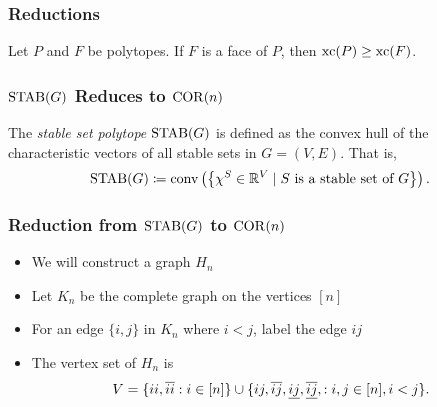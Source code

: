 \begin{frame}
\frametitle{Reductions}
\begin{lemma}
Let $P$ and $F$ be polytopes. If $F$ is a face of $P$, then $\operatorname{xc}(P) \ge \operatorname{xc}(F)$.
\end{lemma}
\end{frame}

\begin{frame}
\frametitle{$\operatorname{STAB}(G)$ Reduces to $\operatorname{COR}(n)$}
\begin{definition}
The \emph{stable set polytope} $\operatorname{STAB}(G)$ is defined as the convex hull of the characteristic vectors of all stable sets in $G = (V, E)$. That is,
\[
\operatorname{STAB}(G) \coloneqq \operatorname{conv}\left(\left\{\chi^S \in \mathbb{R}^V \mid S \text{ is a stable set of $G$}\right\}\right).
\]
\end{definition}
\end{frame}

\begin{frame}
\frametitle{Reduction from $\operatorname{STAB}(G)$ to $\operatorname{COR}(n)$}
\begin{itemize}
\item<1-> We will construct a graph $H_n$
\item<2-> Let $K_n$ be the complete graph on the vertices $[n]$
\item<3-> For an edge $\{i,j\}$ in $K_n$ where $i < j$, label the edge $ij$
\item<4-> The vertex set of $H_n$ is
\[
V = \{ii, \overline{ii} : i \in [n]\} \cup \{ij, \overline{ij}, \underline{ij}, \overline{\underline{ij}}, : i,j \in [n], i < j\}.
\]
\end{itemize}
\end{frame}

